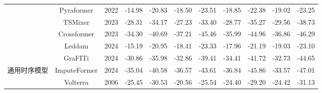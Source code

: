 \begin{table}[]
\begin{tabular}{c|c|c|cc|cc|cc|cc}
                          & Pyraformer           & 2022                 & -14.98                         & -20.83                         & -18.50                         & -23.51                         & -18.85                         & -22.38                         & -19.02                         & -23.25                         \\
                          & TSMixer              & 2023                 & -28.31                         & -34.17                         & -27.23                         & -33.40                         & -28.77                         & -35.27                         & -29.56                         & -38.73                         \\
                          & Crossformer          & 2023                 & -34.30                         & -40.69                         & -37.21                         & -45.46                         & -35.99                         & -44.96                         & -36.86                         & -46.29                         \\
                          & Leddam               & 2024                 & -15.19                         & -20.95                         & -18.41                         & -23.33                         & -17.96                         & -21.19                         & -19.03                         & -23.10                         \\
                          & GraFITi              & 2024                 & -30.86                         & -35.98                         & -32.86                         & -39.41                         & -34.41                         & -41.72                         & -32.73                         & -44.65                         \\
\multirow{-10}{*}{通用时序模型} & ImputeFormer         & 2024                 & -35.04                         & -40.58                         & -36.57                         & -43.61                         & -36.84                         & -45.86                         & -33.57                         & -47.01                         \\ \hline
                          & Volterra             & 2006                 & -25.45                         & -30.53                         & -20.56                         & -25.54                         & -24.40                         & -29.20                         & -24.42                         & -31.13                         \\

\end{tabular}
\end{table}
